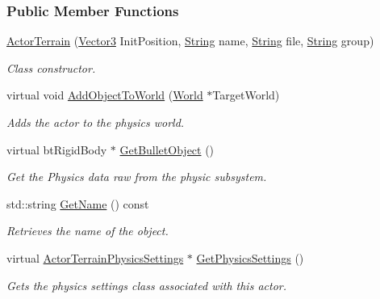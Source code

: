 \subsubsection*{Public Member Functions}
\begin{DoxyCompactItemize}
\item 
\hyperlink{classphys_1_1ActorTerrain_af0d3b88d5ee409c5451bb13a20254176}{ActorTerrain} (\hyperlink{classphys_1_1Vector3}{Vector3} InitPosition, \hyperlink{namespacephys_aa03900411993de7fbfec4789bc1d392e}{String} name, \hyperlink{namespacephys_aa03900411993de7fbfec4789bc1d392e}{String} file, \hyperlink{namespacephys_aa03900411993de7fbfec4789bc1d392e}{String} group)
\begin{DoxyCompactList}\small\item\em Class constructor. \item\end{DoxyCompactList}\item 
virtual void \hyperlink{classphys_1_1ActorTerrain_a890ee6f67fda30381bce9c949ae36566}{AddObjectToWorld} (\hyperlink{classphys_1_1World}{World} $\ast$TargetWorld)
\begin{DoxyCompactList}\small\item\em Adds the actor to the physics world. \item\end{DoxyCompactList}\item 
virtual btRigidBody $\ast$ \hyperlink{classphys_1_1ActorTerrain_a1bed32f1b9afd1bd28c231b7505c267e}{GetBulletObject} ()
\begin{DoxyCompactList}\small\item\em Get the Physics data raw from the physic subsystem. \item\end{DoxyCompactList}\item 
std::string \hyperlink{classphys_1_1ActorTerrain_a08f306ae189e55d780dcaa2c43d7b6eb}{GetName} () const 
\begin{DoxyCompactList}\small\item\em Retrieves the name of the object. \item\end{DoxyCompactList}\item 
virtual \hyperlink{classphys_1_1ActorTerrainPhysicsSettings}{ActorTerrainPhysicsSettings} $\ast$ \hyperlink{classphys_1_1ActorTerrain_a5768f289e8abaf0805eae274fd215f3a}{GetPhysicsSettings} ()
\begin{DoxyCompactList}\small\item\em Gets the physics settings class associated with this actor. \item\end{DoxyCompactList}\item 

\end{DoxyCompactItemize}
